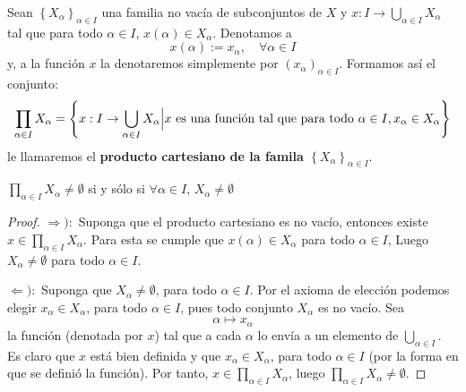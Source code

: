 \documentclass[12pt]{report}
\theoremstyle{largebreak}
\newcommand\cf[3]{\ensuremath{#1:#2\rightarrow#3}}
\begin{document}
    \begin{mydef}
        Sean $\left\{X_\alpha \right\}_{\alpha\in I}$ una familia no vacía de subconjuntos de $X$ y $\cf{x}{I}{\bigcup_{\alpha\in I}X_\alpha}$ tal que para todo $\alpha\in I$, $x(\alpha)\in X_\alpha$. Denotamos a
        \begin{equation*}
            x(\alpha):=x_\alpha,\quad\forall \alpha\in I
        \end{equation*}
        y, a la función $x$ la denotaremos simplemente por $\left(x_\alpha \right)_{\alpha\in I}$. Formamos así el conjunto:
        \begin{equation*}
            \prod_{\alpha\in I}X_\alpha=\left\{\cf{x}{I}{\bigcup_{\alpha\in I}X_\alpha}\Big|x\textup{ es una función tal que para todo }\alpha\in I,x_\alpha\in X_\alpha \right\}
        \end{equation*}
        le llamaremos el \textbf{producto cartesiano de la famila $\left\{X_\alpha \right\}_{\alpha\in I}$}.
    \end{mydef}

    \begin{propo}
        $\prod_{\alpha\in I}X_\alpha\neq\emptyset$ si y sólo si $\forall\alpha\in I$, $X_\alpha\neq\emptyset$
    \end{propo}

    \begin{proof}
        $\Rightarrow):$ Suponga que el producto cartesiano es no vacío, entonces existe $x\in\prod_{\alpha\in I}X_\alpha$. Para esta se cumple que $x(\alpha)\in X_\alpha$ para todo $\alpha\in I$, Luego $X_\alpha\neq\emptyset$ para todo $\alpha\in I$.

        $\Leftarrow):$ Suponga que $X_\alpha\neq\emptyset$, para todo $\alpha\in I$. Por el axioma de elección podemos elegir $x_\alpha\in X_\alpha$, para todo $\alpha\in I$, pues todo conjunto $X_\alpha$ es no vacío. Sea
        \begin{equation}
            \alpha\mapsto x_\alpha
        \end{equation}
        la función (denotada por $x$) tal que a cada $\alpha$ lo envía a un elemento de $\bigcup_{\alpha\in I}$. Es claro que $x$ está bien definida y que $x_\alpha\in X_\alpha$, para todo $\alpha\in I$ (por la forma en que se definió la función). Por tanto, $x\in\prod_{\alpha\in I}X_\alpha$, luego $\prod_{\alpha\in I}X_\alpha\neq\emptyset$.

    \end{proof}
\end{document}
